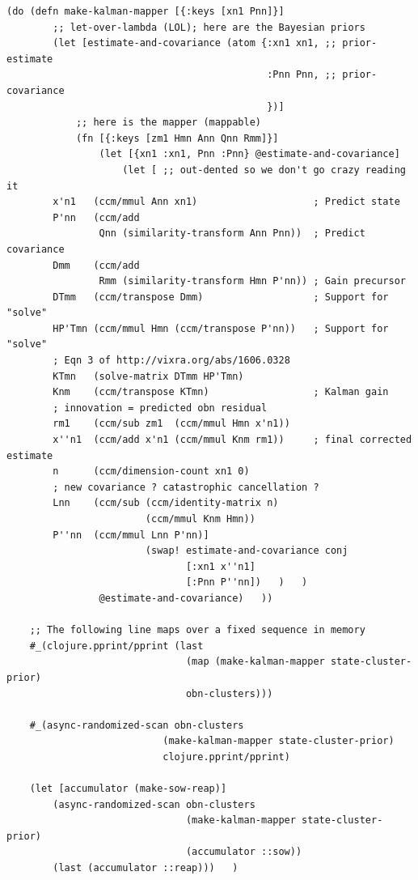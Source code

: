 \documentclass[10pt,oneside,x11names]{article}
\begin{document}
\begin{verbatim}
(do (defn make-kalman-mapper [{:keys [xn1 Pnn]}]
        ;; let-over-lambda (LOL); here are the Bayesian priors
        (let [estimate-and-covariance (atom {:xn1 xn1, ;; prior-estimate
                                             :Pnn Pnn, ;; prior-covariance
                                             })]
            ;; here is the mapper (mappable)
            (fn [{:keys [zm1 Hmn Ann Qnn Rmm]}]
                (let [{xn1 :xn1, Pnn :Pnn} @estimate-and-covariance]
                    (let [ ;; out-dented so we don't go crazy reading it
        x'n1   (ccm/mmul Ann xn1)                    ; Predict state
        P'nn   (ccm/add
                Qnn (similarity-transform Ann Pnn))  ; Predict covariance
        Dmm    (ccm/add
                Rmm (similarity-transform Hmn P'nn)) ; Gain precursor
        DTmm   (ccm/transpose Dmm)                   ; Support for "solve"
        HP'Tmn (ccm/mmul Hmn (ccm/transpose P'nn))   ; Support for "solve"
        ; Eqn 3 of http://vixra.org/abs/1606.0328
        KTmn   (solve-matrix DTmm HP'Tmn)
        Knm    (ccm/transpose KTmn)                  ; Kalman gain
        ; innovation = predicted obn residual
        rm1    (ccm/sub zm1  (ccm/mmul Hmn x'n1))
        x''n1  (ccm/add x'n1 (ccm/mmul Knm rm1))     ; final corrected estimate
        n      (ccm/dimension-count xn1 0)
        ; new covariance ? catastrophic cancellation ?
        Lnn    (ccm/sub (ccm/identity-matrix n)
                        (ccm/mmul Knm Hmn))
        P''nn  (ccm/mmul Lnn P'nn)]
                        (swap! estimate-and-covariance conj
                               [:xn1 x''n1]
                               [:Pnn P''nn])   )   )
                @estimate-and-covariance)   ))

    ;; The following line maps over a fixed sequence in memory
    #_(clojure.pprint/pprint (last
                               (map (make-kalman-mapper state-cluster-prior)
                               obn-clusters)))

    #_(async-randomized-scan obn-clusters
                           (make-kalman-mapper state-cluster-prior)
                           clojure.pprint/pprint)

    (let [accumulator (make-sow-reap)]
        (async-randomized-scan obn-clusters
                               (make-kalman-mapper state-cluster-prior)
                               (accumulator ::sow))
        (last (accumulator ::reap)))   )
\end{verbatim}
\end{document}
